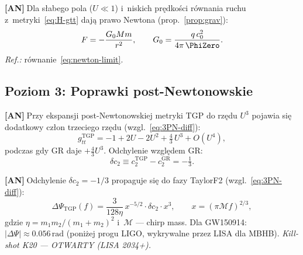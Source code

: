 \begin{chain}\label{chain:A12}
  \textbf{[AN]}$\;$Dla s\l{}abego pola ($U \ll 1$)
  i~niskich pr\k{e}dko\'sci r\'ownania ruchu z~metryki~\eqref{eq:H-gtt}
  daj\k{a} prawo Newtona (prop.~\ref{prop:grav}):
  \begin{equation}\label{eq:H-newton}
    F = -\frac{G_0 M m}{r^2},\qquad
    G_0 = \frac{q\,c_0^2}{4\pi\,\PhiZero}.
  \end{equation}
  \emph{Ref.:} r\'ownanie~\eqref{eq:newton-limit}.
\end{chain}

\subsection{Poziom 3: Poprawki post-Newtonowskie}%
\label{app:H-PN}

\begin{chain}[A13 --- Poprawka 3PN: $\Delta c_2 = -1/3$]\label{chain:A13}
  \textbf{[AN]}$\;$Przy ekspansji post-Newtonowskiej metryki TGP
  do rz\k{e}du $U^3$ pojawia si\k{e} dodatkowy cz\l{}on trzeciego
  rz\k{e}du (wzgl.~\eqref{eq:3PN-diff}):
  \begin{equation}\label{eq:H-3PN}
    g_{tt}^{\mathrm{TGP}} = -1 + 2U - 2U^2 + \tfrac{4}{3}\,U^3 + O(U^4),
  \end{equation}
  podczas gdy GR daje $+\frac{4}{3}U^3$.
  Odchylenie wzgl\k{e}dem GR:
  \begin{equation}\label{eq:H-delta-c2}
    \delta c_2 \equiv c_2^{\mathrm{TGP}} - c_2^{\mathrm{GR}} = -\tfrac{1}{3}.
  \end{equation}
\end{chain}

\begin{chain}%
  \label{chain:A14}
  \textbf{[AN]}$\;$Odchylenie $\delta c_2 = -1/3$ propaguje si\k{e}
  do fazy TaylorF2 (wzgl.~\eqref{eq:3PN-diff}):
  \begin{equation}\label{eq:H-TaylorF2}
    \Delta\Psi_{\mathrm{TGP}}(f)
    = \frac{3}{128\eta}\,x^{-5/2}\cdot\delta c_2\cdot x^3,
    \qquad
    x = (\pi\mathcal{M}f)^{2/3},
  \end{equation}
  gdzie $\eta = m_1 m_2 / (m_1+m_2)^2$ i~$\mathcal{M}$ --- chirp mass.
  Dla GW150914: $|\Delta\Psi| \approx 0.056\,\mathrm{rad}$
  (poni\.zej progu LIGO, wykrywalne przez LISA dla MBHB).
  \emph{Kill-shot K20 --- OTWARTY (LISA 2034+).}
\end{chain}

